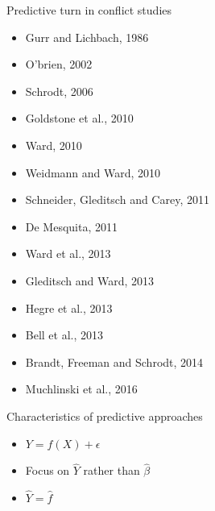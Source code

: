 \documentclass{beamer}
\begin{document}
\begin{frame}{Predictive turn in conflict studies}
\begin{minipage}{2.1in}
\begin{tiny}
\begin{itemize}
\item Gurr and Lichbach, 1986
\item O'brien, 2002
\item Schrodt, 2006
\item Goldstone et al., 2010
\item Ward, 2010
\item Weidmann and Ward, 2010
\item Schneider, Gleditsch and Carey, 2011
\end{itemize}
 \end{tiny}
\end{minipage}
\begin{minipage}{2.5in}
\begin{tiny}
\begin{itemize}
\item De Mesquita, 2011
\item Ward et al., 2013
\item Gleditsch and Ward, 2013
\item Hegre et al., 2013
\item Bell et al., 2013
\item Brandt, Freeman and Schrodt, 2014
\item Muchlinski et al., 2016
\end{itemize}
 \end{tiny}
\end{minipage}

\begin{block}{Characteristics of predictive approaches} 
\begin{itemize}
\item $Y=f(X)+\epsilon$
\item Focus on $\hat{Y}$ rather than $\hat{\beta}$
\item $\hat{Y}=\hat{f}$
\end{itemize}
\end{block}
\end{frame}
\end{document}
